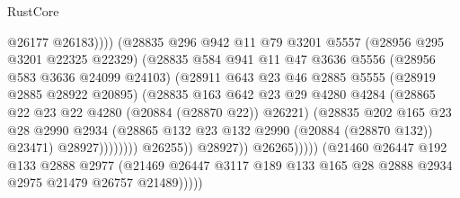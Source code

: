 \begin{lexlean}{RustCore}
\begin{coremodule}
                                          @26177
                                          @26183))))
                                  (@28835
                                    @296
                                    @942
                                    @11
                                    @79
                                    @3201
                                    @5557
                                    (@28956 @295 @3201 @22325 @22329)
                                    (@28835
                                      @584
                                      @941
                                      @11
                                      @47
                                      @3636
                                      @5556
                                      (@28956 @583 @3636 @24099 @24103)
                                      (@28911
                                        @643
                                        @23
                                        @46
                                        @2885
                                        @5555
                                        (@28919 @2885 @28922 @20895)
                                        (@28835
                                          @163
                                          @642
                                          @23
                                          @29
                                          @4280
                                          @4284
                                          (@28865 @22 @23 @22 @4280 (@20884 (@28870 @22)) @26221)
                                          (@28835
                                            @202
                                            @165
                                            @23
                                            @28
                                            @2990
                                            @2934
                                            (@28865
                                              @132
                                              @23
                                              @132
                                              @2990
                                              (@20884 (@28870 @132))
                                              @23471)
                                            @28927))))))))
                            @26255))
                        @28927))
                    @26265)))))
          (@21460
            @26447
            @192
            @133
            @2888
            @2977
            (@21469 @26447 @3117 @189 @133 @165 @28 @2888 @2934 @2975 @21479 @26757 @21489)))))

\end{coremodule}
\end{lexlean}
